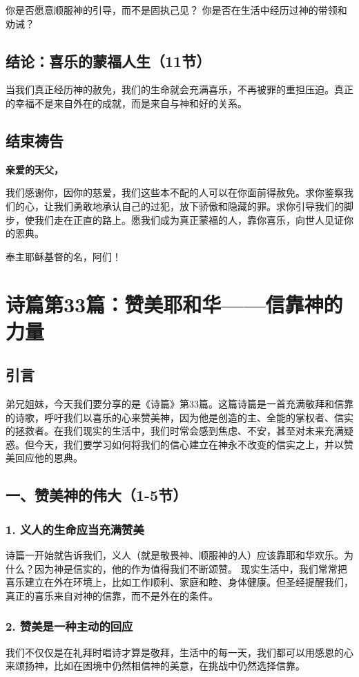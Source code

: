 \documentclass[a4paper, 12pt]{article}
\begin{document}
你是否愿意顺服神的引导，而不是固执己见？
你是否在生活中经历过神的带领和劝诫？
\subsection*{结论：喜乐的蒙福人生（11节）}

当我们真正经历神的赦免，我们的生命就会充满喜乐，不再被罪的重担压迫。真正的幸福不是来自外在的成就，而是来自与神和好的关系。

\subsection*{结束祷告}
\textbf{亲爱的天父，}

我们感谢你，因你的慈爱，我们这些本不配的人可以在你面前得赦免。求你鉴察我们的心，让我们勇敢地承认自己的过犯，放下骄傲和隐藏的罪。求你引导我们的脚步，使我们走在正直的路上。愿我们成为真正蒙福的人，靠你喜乐，向世人见证你的恩典。

奉主耶稣基督的名，阿们！
\newpage
\section{诗篇第33篇：赞美耶和华——信靠神的力量}
\subsection*{引言}
弟兄姐妹，今天我们要分享的是《诗篇》第33篇。这篇诗篇是一首充满敬拜和信靠的诗歌，呼吁我们以喜乐的心来赞美神，因为他是创造的主、全能的掌权者、信实的拯救者。在我们现实的生活中，我们时常会感到焦虑、不安，甚至对未来充满疑惑。但今天，我们要学习如何将我们的信心建立在神永不改变的信实之上，并以赞美回应他的恩典。

\subsection*{一、赞美神的伟大（1-5节）}

\subsubsection*{1. 义人的生命应当充满赞美}
诗篇一开始就告诉我们，义人（就是敬畏神、顺服神的人）应该靠耶和华欢乐。为什么？因为神是信实的，他的作为值得我们不断颂赞。
现实生活中，我们常常把喜乐建立在外在环境上，比如工作顺利、家庭和睦、身体健康。但圣经提醒我们，真正的喜乐来自对神的信靠，而不是外在的条件。

\subsubsection*{2. 赞美是一种主动的回应}
我们不仅仅是在礼拜时唱诗才算是敬拜，生活中的每一天，我们都可以用感恩的心来颂扬神，比如在困境中仍然相信神的美意，在挑战中仍然选择信靠。
\end{document}
